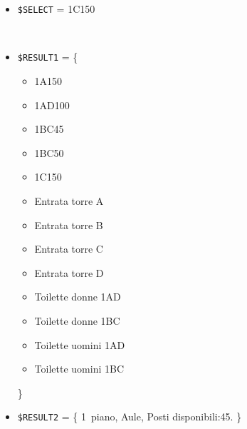 \documentclass[../../SperimentazioniPratiche.tex]{subfiles}
\begin{document}
			\paragraph*{}
			\label{2Prova12A.1}
			\begin{tcolorbox}[fonttitle=\bfseries, 
								adjusted title={\Large Prova 12A.1}, 
								breakable, 
								sharp corners=south,
								colback=white, 
								colframe=white!60!black]
								
				\begin{description}[leftmargin=0.7cm,labelwidth=!]
				
					\item[Input] \ \par 
        				\begin{itemize}
        					\item \verb|$SELECT| = 1C150
        				\end{itemize}
        				
        			\tcbline 
        				
        			\item[Output atteso] \ \par
        				\begin{itemize}
        					\item \verb|$RESULT1| = \{
        					\begin{itemize}
        						\item 1A150
								\item 1AD100
								\item 1BC45
								\item 1BC50
								\item 1C150
								\item Entrata torre A
								\item Entrata torre B
								\item Entrata torre C
								\item Entrata torre D
								\item Toilette donne 1AD
								\item Toilette donne 1BC
								\item Toilette uomini 1AD
								\item Toilette uomini 1BC
        					\end{itemize}
        					\}
        					\item \verb|$RESULT2| = \{
        						1\degree\ piano, Aule, Posti disponibili:45. 
        					\}
        				\end{itemize}


\end{description}
\end{tcolorbox}
\end{document}
